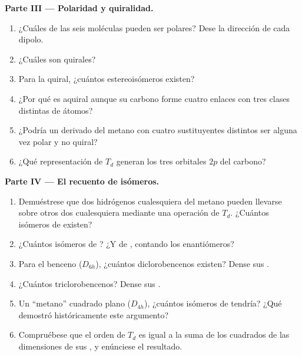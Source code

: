 \begin{problem}
\medskip\noindent\textbf{Parte III --- Polaridad y quiralidad.}
\begin{enumerate}[resume]
  \item ¿Cuáles de las seis moléculas pueden ser polares? Dese la dirección de cada
        dipolo.
  \item ¿Cuáles son quirales?
  \item Para la quiral, ¿cuántos estereoisómeros existen?
  \item ¿Por qué es aquiral  aunque su carbono forme cuatro enlaces con
        tres clases distintas de átomos?
  \item ¿Podría un derivado del metano con cuatro sustituyentes distintos ser alguna vez
        polar y no quiral?
  \item ¿Qué representación de $T_d$ generan los tres orbitales $2p$ del
        carbono?
\end{enumerate}

\medskip\noindent\textbf{Parte IV --- El recuento de isómeros.}
\begin{enumerate}[resume]
  \item Demuéstrese que dos hidrógenos cualesquiera del metano pueden llevarse sobre otros dos
        cualesquiera mediante una operación de $T_d$. ¿Cuántos isómeros de  existen?
  \item ¿Cuántos isómeros de ? ¿Y de , contando los enantiómeros?
  \item Para el benceno ($D_{6h}$), ¿cuántos diclorobencenos existen? Dense sus
        .
  \item ¿Cuántos triclorobencenos? Dense sus .
  \item Un ``metano'' cuadrado plano ($D_{4h}$), ¿cuántos isómeros de
         tendría? ¿Qué demostró históricamente este argumento?
  \item Compruébese que el orden de $T_d$ es igual a la suma de los cuadrados de las dimensiones
        de sus , y enúnciese el resultado.
\end{enumerate}
\end{problem}
